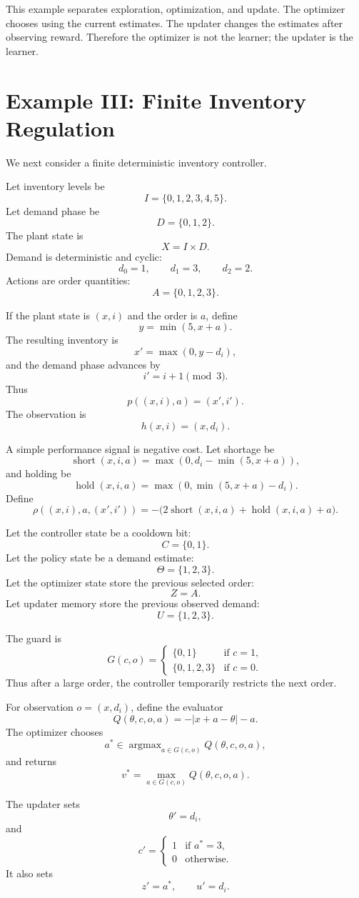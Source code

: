 This example separates exploration, optimization, and update.  The optimizer chooses using the
current estimates.  The updater changes the estimates after observing reward.  Therefore the
optimizer is not the learner; the updater is the learner.

\section{Example III: Finite Inventory Regulation}
\label{sec:example-inventory-regulation}

We next consider a finite deterministic inventory controller.

Let inventory levels be
\[
I=\{0,1,2,3,4,5\}.
\]
Let demand phase be
\[
D=\{0,1,2\}.
\]
The plant state is
\[
X=I\times D.
\]
Demand is deterministic and cyclic:
\[
d_0=1,
\qquad
d_1=3,
\qquad
d_2=2.
\]
Actions are order quantities:
\[
A=\{0,1,2,3\}.
\]

If the plant state is \((x,i)\) and the order is \(a\), define
\[
y=\min(5,x+a).
\]
The resulting inventory is
\[
x'=\max(0,y-d_i),
\]
and the demand phase advances by
\[
i'=i+1\pmod 3.
\]
Thus
\[
p((x,i),a)=(x',i').
\]
The observation is
\[
h(x,i)=(x,d_i).
\]

A simple performance signal is negative cost.  Let shortage be
\[
\operatorname{short}(x,i,a)=\max(0,d_i-\min(5,x+a)),
\]
and holding be
\[
\operatorname{hold}(x,i,a)=\max(0,\min(5,x+a)-d_i).
\]
Define
\[
\rho((x,i),a,(x',i'))
=
-\bigl(2\operatorname{short}(x,i,a)+\operatorname{hold}(x,i,a)+a\bigr).
\]

Let the controller state be a cooldown bit:
\[
C=\{0,1\}.
\]
Let the policy state be a demand estimate:
\[
\Theta=\{1,2,3\}.
\]
Let the optimizer state store the previous selected order:
\[
Z=A.
\]
Let updater memory store the previous observed demand:
\[
U=\{1,2,3\}.
\]

The guard is
\[
G(c,o)=
\begin{cases}
\{0,1\} & \text{if } c=1,\\
\{0,1,2,3\} & \text{if } c=0.
\end{cases}
\]
Thus after a large order, the controller temporarily restricts the next order.

For observation \(o=(x,d_i)\), define the evaluator
\[
Q(\theta,c,o,a)
=
-\left|x+a-\theta\right|-a.
\]
The optimizer chooses
\[
a^*\in \operatorname{argmax}_{a\in G(c,o)}Q(\theta,c,o,a),
\]
and returns
\[
v^*=\max_{a\in G(c,o)}Q(\theta,c,o,a).
\]

The updater sets
\[
\theta'=d_i,
\]
and
\[
c'=
\begin{cases}
1 & \text{if } a^*=3,\\
0 & \text{otherwise}.
\end{cases}
\]
It also sets
\[
z'=a^*,
\qquad
u'=d_i.
\]

